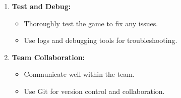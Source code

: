 \begin{enumerate}
\item \textbf{Test and Debug:}
\begin{itemize}
	\item Thoroughly test the game to fix any issues.
	\item Use logs and debugging tools for troubleshooting.
\end{itemize}

\item \textbf{Team Collaboration:}
\begin{itemize}
	\item Communicate well within the team.
	\item Use Git for version control and collaboration.
\end{itemize}
\end{enumerate}